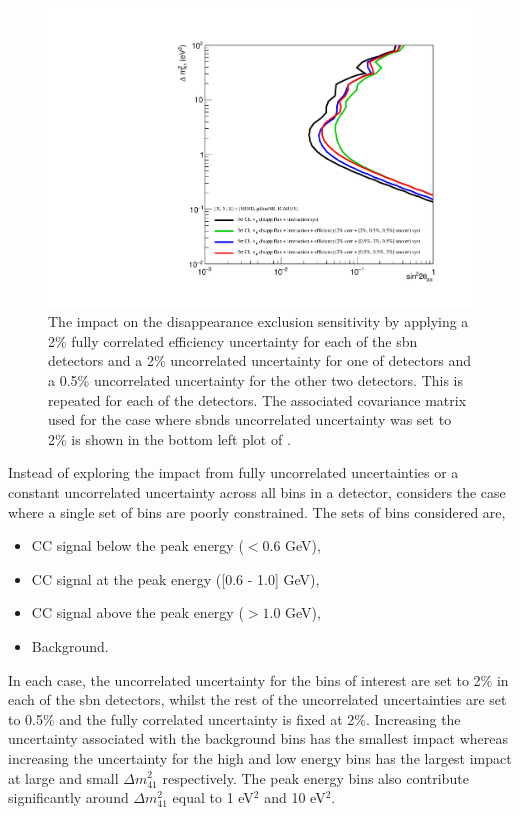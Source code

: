\begin{figure}[!h]
    \centering
    \includegraphics[width = \largefigwidth]{figures-chap6/exclusion_contours/efficiency_systematics/numu_disapp_2pct_cor_2pct_X_05pct_other_per_detector_uncor.pdf}
    \caption[Impact of a 2\% uncorrelated efficiency systematic for one detector and 0.5\% for the other two on the \numu disappearance channel.]{The impact on the \numu disappearance exclusion sensitivity by applying a 2\% fully correlated efficiency uncertainty for each of the \gls{sbn} detectors and a 2\% uncorrelated uncertainty for one of detectors and a 0.5\% uncorrelated uncertainty for the other two detectors. This is repeated for each of the detectors. The associated covariance matrix used for the case where \glspl{sbnd} uncorrelated uncertainty was set to 2\% is shown in the bottom left plot of .}
    \label{fig:numu_uncorr}
\end{figure}

\newpage
Instead of exploring the impact from fully uncorrelated uncertainties or a constant uncorrelated uncertainty across all bins in a detector,  considers the case where a single set of bins are poorly constrained. The sets of bins considered are,
\begin{itemize}
    \item CC signal below the peak energy ($< 0.6$ GeV),
    \item CC signal at the peak energy ([0.6 - 1.0] GeV),
    \item CC signal above the peak energy ($> 1.0$ GeV),
    \item Background.
\end{itemize}
In each case, the uncorrelated uncertainty for the bins of interest are set to 2\% in each of the \gls{sbn} detectors, whilst the rest of the uncorrelated uncertainties are set to 0.5\% and the fully correlated uncertainty is fixed at 2\%. Increasing the uncertainty associated with the background bins has the smallest impact whereas increasing the uncertainty for the high and low energy bins has the largest impact at large and small $\Delta m^2_{41}$ respectively. The peak energy bins also contribute significantly around $\Delta m^2_{41}$ equal to 1 eV$^2$ and 10 eV$^2$. 


